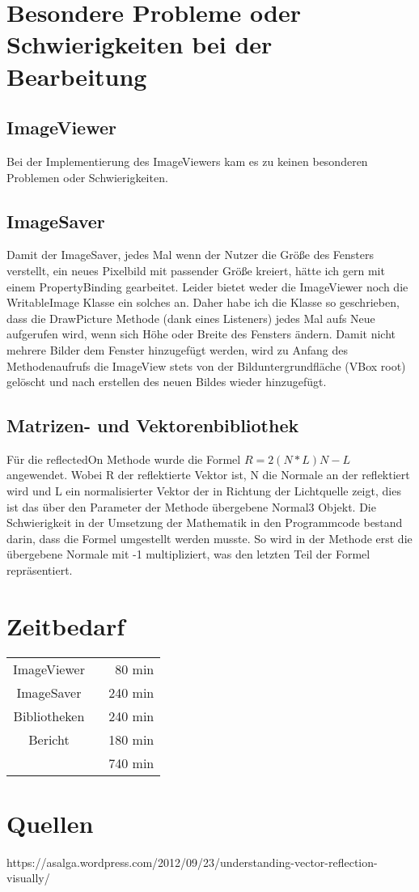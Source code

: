 \documentclass[14pt]{extarticle}
\begin{document}
\section{Besondere Probleme oder Schwierigkeiten bei der Bearbeitung}
\subsection{ImageViewer}
Bei der Implementierung des ImageViewers kam es zu keinen besonderen Problemen oder Schwierigkeiten.
\subsection{ImageSaver}
Damit der ImageSaver, jedes Mal wenn der Nutzer die Größe des Fensters verstellt, ein neues Pixelbild mit passender Größe kreiert, hätte ich gern mit einem PropertyBinding gearbeitet. 
Leider bietet weder die ImageViewer noch die WritableImage Klasse ein solches an. Daher habe ich die Klasse so geschrieben, dass die DrawPicture Methode (dank eines Listeners) jedes Mal aufs Neue aufgerufen wird, wenn sich Höhe oder Breite des Fensters ändern. 
\newline
Damit nicht mehrere Bilder dem Fenster hinzugefügt werden, wird zu Anfang des Methodenaufrufs die ImageView stets von der Bilduntergrundfläche (VBox root) gelöscht und nach erstellen des neuen Bildes wieder hinzugefügt. 
\subsection{Matrizen- und Vektorenbibliothek}
Für die reflectedOn Methode wurde die Formel 
\begin{math} R=2(N*L)N-L \end{math}
angewendet.  Wobei R der reflektierte Vektor ist, N die Normale an der reflektiert wird und L ein normalisierter Vektor der in Richtung der Lichtquelle zeigt, dies ist das über den Parameter der Methode übergebene Normal3 Objekt. Die Schwierigkeit in der Umsetzung der Mathematik in den Programmcode bestand darin, dass die Formel umgestellt werden musste. So wird in der Methode erst die übergebene Normale mit -1 multipliziert, was den letzten Teil der Formel repräsentiert. 

\section{Zeitbedarf}
\begin{center}
\begin{tabular}{cr}
ImageViewer	  \	&80 min	\\
ImageSaver 	\	&240 min	\\
Bibliotheken \	&240 min	\\
Bericht  \		&180 min	 \\
	\hline
	&740 min
\end{tabular}
\end{center}

\section{Quellen}
https://asalga.wordpress.com/2012/09/23/understanding-vector-reflection-visually/
\end{document}

